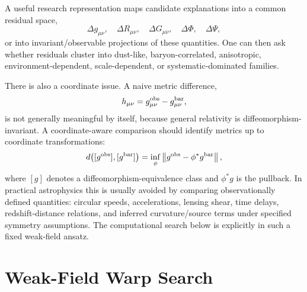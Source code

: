 \documentclass[10pt]{article}
\begin{document}
A useful research representation maps candidate explanations into a common residual space,
\begin{equation}
\Delta g_{\mu\nu},
\quad
\Delta R_{\mu\nu},
\quad
\Delta G_{\mu\nu},
\quad
\Delta\Phi,
\quad
\Delta\Psi,
\end{equation}
or into invariant/observable projections of these quantities. One can then ask whether residuals cluster into dust-like, baryon-correlated, anisotropic, environment-dependent, scale-dependent, or systematic-dominated families.

There is also a coordinate issue. A naive metric difference,
\begin{equation}
h_{\mu\nu}
=
g^{\rm obs}_{\mu\nu}-g^{\rm bar}_{\mu\nu},
\end{equation}
is not generally meaningful by itself, because general relativity is diffeomorphism-invariant. A coordinate-aware comparison should identify metrics up to coordinate transformations:
\begin{equation}
d\!\left([g^{\rm obs}],[g^{\rm bar}]\right)
=
\inf_\phi
\left\|
g^{\rm obs}-\phi^\ast g^{\rm bar}
\right\|,
\end{equation}
where $[g]$ denotes a diffeomorphism-equivalence class and $\phi^\ast g$ is the pullback. In practical astrophysics this is usually avoided by comparing observationally defined quantities: circular speeds, accelerations, lensing shear, time delays, redshift-distance relations, and inferred curvature/source terms under specified symmetry assumptions. The computational search below is explicitly in such a fixed weak-field ansatz.

\section{Weak-Field Warp Search}
\end{document}
